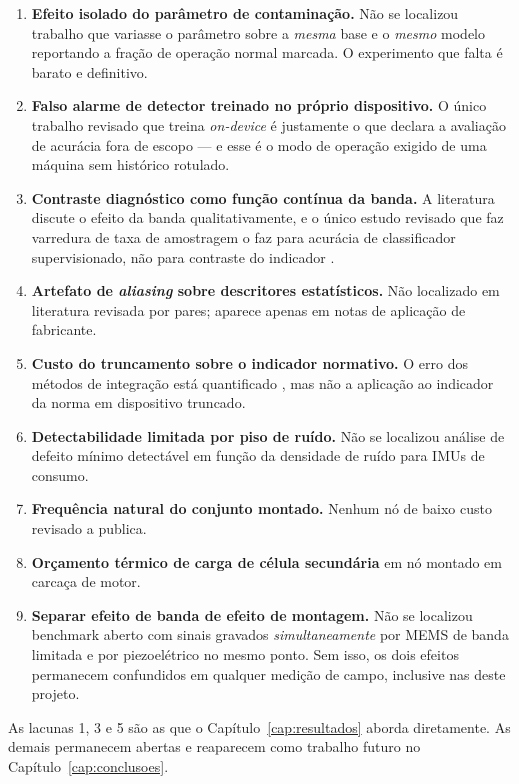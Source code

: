 \begin{enumerate}
  \item \textbf{Efeito isolado do parâmetro de contaminação.} Não se localizou trabalho que
        variasse o parâmetro sobre a \emph{mesma} base e o \emph{mesmo} modelo reportando a
        fração de operação normal marcada. O experimento que falta é barato e definitivo.
  \item \textbf{Falso alarme de detector treinado no próprio dispositivo.} O único trabalho
        revisado que treina \emph{on-device} é justamente o que declara a avaliação de
        acurácia fora de escopo \cite{antonini2023} --- e esse é o modo de operação exigido
        de uma máquina sem histórico rotulado.
  \item \textbf{Contraste diagnóstico como função contínua da banda.} A literatura discute
        o efeito da banda qualitativamente, e o único estudo revisado que faz varredura de
        taxa de amostragem o faz para acurácia de classificador supervisionado, não para
        contraste do indicador \cite{elbouharrouti2024}.
  \item \textbf{Artefato de \emph{aliasing} sobre descritores estatísticos.} Não localizado
        em literatura revisada por pares; aparece apenas em notas de aplicação de
        fabricante.
  \item \textbf{Custo do truncamento sobre o indicador normativo.} O erro dos métodos de
        integração está quantificado \cite{brandt2014}, mas não a aplicação ao indicador da
        norma em dispositivo truncado.
  \item \textbf{Detectabilidade limitada por piso de ruído.} Não se localizou análise de
        defeito mínimo detectável em função da densidade de ruído para IMUs de consumo.
  \item \textbf{Frequência natural do conjunto montado.} Nenhum nó de baixo custo revisado
        a publica.
  \item \textbf{Orçamento térmico de carga de célula secundária} em nó montado em carcaça
        de motor.
  \item \textbf{Separar efeito de banda de efeito de montagem.} Não se localizou benchmark
        aberto com sinais gravados \emph{simultaneamente} por MEMS de banda limitada e por
        piezoelétrico no mesmo ponto. Sem isso, os dois efeitos permanecem confundidos em
        qualquer medição de campo, inclusive nas deste projeto.
\end{enumerate}

As lacunas 1, 3 e 5 são as que o Capítulo~\ref{cap:resultados} aborda diretamente. As
demais permanecem abertas e reaparecem como trabalho futuro no
Capítulo~\ref{cap:conclusoes}.
